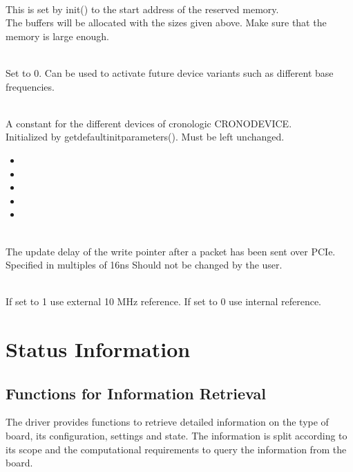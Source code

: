 			\\
			This is set by \prefix init() to the start address of the reserved memory.\\ 
			The buffers will be allocated with the sizes given above. Make sure that the memory is large enough.\par

			\\
			Set to 0. Can be used to activate future device variants such as different base frequencies.\par

			\\
			A constant for the different devices of cronologic \textsf{CRONO\tu DEVICE\tu *}.\\
			Initialized by \textsf{\prefix get\tu default\tu init\tu parameters()}. Must be left unchanged.
			\begin{itemize}
				\item[] 
				\item[] 
				\item[] 
				\item[] 
				\item[] 
			\end{itemize}

			\\
			The update delay of the write pointer after a packet has been sent over PCIe. Specified in multiples of 16ns
			Should not be changed by the user.\par

			\\
			If set to 1 use external 10 MHz reference. If set to 0 use internal reference.\par

	\section{Status Information}
		\subsection{Functions for Information Retrieval}

			The driver provides functions to retrieve detailed information on the type of board, its configuration, settings and state. The information is split according to its scope and the computational requirements to query the information from the board.

